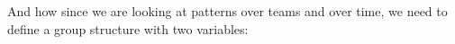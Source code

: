 \documentclass[]{book}
\newenvironment{Shaded}{\begin{snugshade}}{\end{snugshade}}
\newcommand{\DataTypeTok}[1]{\textcolor[rgb]{0.13,0.29,0.53}{#1}}
\newcommand{\DecValTok}[1]{\textcolor[rgb]{0.00,0.00,0.81}{#1}}
\newcommand{\KeywordTok}[1]{\textcolor[rgb]{0.13,0.29,0.53}{\textbf{#1}}}
\newcommand{\NormalTok}[1]{#1}
\newcommand{\OperatorTok}[1]{\textcolor[rgb]{0.81,0.36,0.00}{\textbf{#1}}}
\newcommand{\StringTok}[1]{\textcolor[rgb]{0.31,0.60,0.02}{#1}}
\theoremstyle{definition}
\theoremstyle{definition}
\theoremstyle{definition}
\theoremstyle{remark}
\begin{document}
And how since we are looking at patterns over teams and over time, we
need to define a group structure with two variables:

\begin{Shaded}
\end{Shaded}
\end{document}
